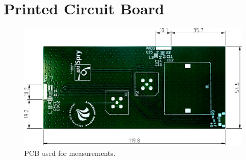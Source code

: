\chapter{Printed Circuit Board}

\begin{figure}[htbp]
    \centering
    \includegraphics[scale=0.5]{img/tech_sol/samanthas_board.pdf}
    \caption{PCB used for measurements.}
    \label{fig:samanthas_board}
\end{figure}
